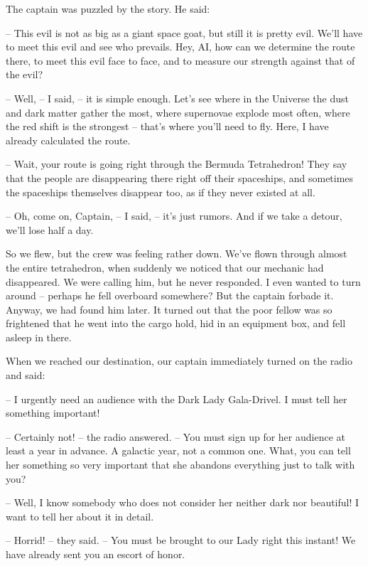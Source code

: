 \documentclass[ebook,oneside,final,openright]{memoir}
\begin{document}
The captain was puzzled by the story. He said:\par
– This evil is not as big as a giant space goat, but still it is pretty evil. We’ll have to meet this evil and see who prevails. Hey, AI, how can we determine the route there, to meet this evil face to face, and to measure our strength against that of the evil?\par
– Well, – I said, – it is simple enough. Let’s see where in the Universe the dust and dark matter gather the most, where supernovae explode most often, where the red shift is the strongest – that’s where you’ll need to fly. Here, I have already calculated the route.\par
– Wait, your route is going right through the Bermuda Tetrahedron! They say that the people are disappearing there right off their spaceships, and sometimes the spaceships themselves disappear too, as if they never existed at all.\par
– Oh, come on, Captain, – I said, – it’s just rumors. And if we take a detour, we’ll lose half a day.\par
\par
So we flew, but the crew was feeling rather down. We’ve flown through almost the entire tetrahedron, when suddenly we noticed that our mechanic had disappeared. We were calling him, but he never responded. I even wanted to turn around – perhaps he fell overboard somewhere? But the captain forbade it. Anyway, we had found him later. It turned out that the poor fellow was so frightened that he went into the cargo hold, hid in an equipment box, and fell asleep in there.\par
\par
When we reached our destination, our captain immediately turned on the radio and said:\par
– I urgently need an audience with the Dark Lady Gala-Drivel. I must tell her something important! \par
– Certainly not! – the radio answered. – You must sign up for her audience at least a year in advance. A galactic year, not a common one. What, you can tell her something so very important that she abandons everything just to talk with you?\par
– Well, I know somebody who does not consider her neither dark nor beautiful! I want to tell her about it in detail.\par
– Horrid! – they said. – You must be brought to our Lady right this instant! We have already sent you an escort of honor.\par
\end{document}
